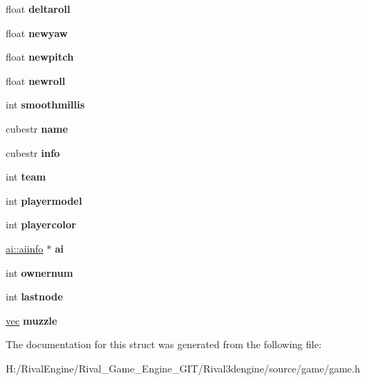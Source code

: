 \begin{DoxyCompactItemize}
\item 
\mbox{\label{structgameent_a5c9cb65191ceb301ebd2fbb0abfa952c}} 
float {\bfseries deltaroll}
\item 
\mbox{\label{structgameent_a382a97bcced87e53e1b4a94161de42a5}} 
float {\bfseries newyaw}
\item 
\mbox{\label{structgameent_aa92bf022c8856fc9f7c31596193c3eb2}} 
float {\bfseries newpitch}
\item 
\mbox{\label{structgameent_a99797cfdf3e45e7efa59265171da1c78}} 
float {\bfseries newroll}
\item 
\mbox{\label{structgameent_a4541e881665dcb944f305c5563c05548}} 
int {\bfseries smoothmillis}
\item 
\mbox{\label{structgameent_a4201601798dd0365f60649b2a88ce82a}} 
cubestr {\bfseries name}
\item 
\mbox{\label{structgameent_ab807211f12d9ab794054e830e2be38ee}} 
cubestr {\bfseries info}
\item 
\mbox{\label{structgameent_ac55bb01225db3cfc0be9e3e3b0f1e15d}} 
int {\bfseries team}
\item 
\mbox{\label{structgameent_a7e6e372eacba1eaa232cc918aa220f17}} 
int {\bfseries playermodel}
\item 
\mbox{\label{structgameent_a8c4ee596e56b0933f9e3b9321cc2657e}} 
int {\bfseries playercolor}
\item 
\mbox{\label{structgameent_a41e549e0b72d9e1fc49c6942e7dc0819}} 
\hyperlink{structai_1_1aiinfo}{ai\+::aiinfo} $\ast$ {\bfseries ai}
\item 
\mbox{\label{structgameent_a45c55aa030133a7cccece63bf13005f8}} 
int {\bfseries ownernum}
\item 
\mbox{\label{structgameent_abb043b1c8e664b30e49868d27e82d77c}} 
int {\bfseries lastnode}
\item 
\mbox{\label{structgameent_a78506020c7df87d82d9af3160e3c1442}} 
\hyperlink{structvec}{vec} {\bfseries muzzle}
\end{DoxyCompactItemize}


The documentation for this struct was generated from the following file\+:\begin{DoxyCompactItemize}
\item 
H\+:/\+Rival\+Engine/\+Rival\+\_\+\+Game\+\_\+\+Engine\+\_\+\+G\+I\+T/\+Rival3dengine/source/game/game.\+h\end{DoxyCompactItemize}
